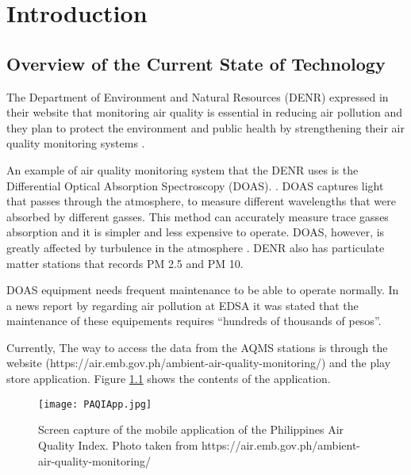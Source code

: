 \chapter{Introduction}
\label{sec:researchdesc}    %

\section{Overview of the Current State of Technology}
\label{sec:overview}
The Department of Environment and Natural Resources (DENR) expressed in their website that monitoring air quality is essential in reducing air pollution and they plan to protect the environment and public health by strengthening their air quality monitoring systems \cite{DENR2020}.

An example of air quality monitoring system that the DENR uses is the Differential Optical Absorption Spectroscopy (DOAS). \cite{DENR_ND}. DOAS captures light that passes through the atmosphere, to measure different wavelengths that were absorbed by different gasses. This method can accurately measure trace gasses absorption and it is simpler and less expensive to operate. DOAS, however, is greatly affected by turbulence in the atmosphere \cite{PlattEtAl2008}. DENR also has particulate matter stations that records PM 2.5 and PM 10. \cite{DENR_ND}

DOAS equipment needs frequent maintenance to be able to operate normally. In a news report by \cite{enano_subingsubing_2019} regarding air pollution at EDSA it was stated that the maintenance of these equipements requires “hundreds of thousands of pesos”.

Currently, The way to access the data from the AQMS stations is through the website (https://air.emb.gov.ph/ambient-air-quality-monitoring/) and the play store application. Figure \ref{fig:PAQIApp} shows the contents of the application.\\

  
\begin{figure}[t]                %
   \centering                    %
   \texttt{[image: PAQIApp.jpg]}      %
   \caption{Screen capture of the mobile application of the Philippines Air Quality Index. Photo taken from https://air.emb.gov.ph/ambient-air-quality-monitoring/ 
}
    \label{fig:PAQIApp}
\end{figure}


